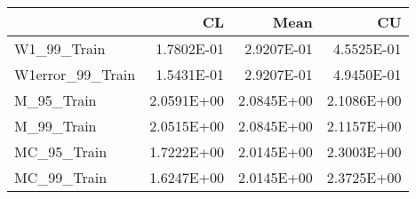 \begin{tabular}{lrrr}
\toprule
{} &         CL &       Mean &         CU \\
\midrule
W1\_99\_Train      & 1.7802E-01 & 2.9207E-01 & 4.5525E-01 \\
W1error\_99\_Train & 1.5431E-01 & 2.9207E-01 & 4.9450E-01 \\
M\_95\_Train       & 2.0591E+00 & 2.0845E+00 & 2.1086E+00 \\
M\_99\_Train       & 2.0515E+00 & 2.0845E+00 & 2.1157E+00 \\
MC\_95\_Train      & 1.7222E+00 & 2.0145E+00 & 2.3003E+00 \\
MC\_99\_Train      & 1.6247E+00 & 2.0145E+00 & 2.3725E+00 \\
\bottomrule
\end{tabular}
